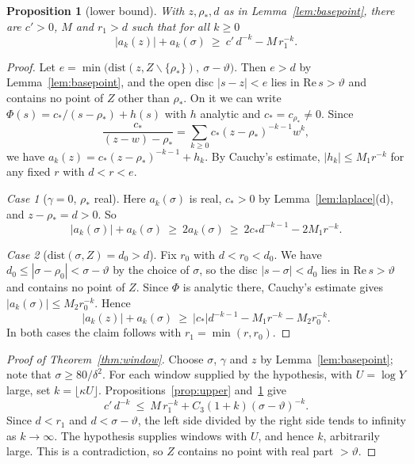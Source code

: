 \documentclass[11pt]{amsart}
\newtheorem{proposition}[theorem]{Proposition}
\theoremstyle{definition}
\theoremstyle{remark}
\begin{document}
\begin{proposition}[lower bound]\label{prop:lower}
With $z,\rho_*,d$ as in Lemma~\ref{lem:basepoint}, there are $c'>0$, $M$ and $r_1>d$ such that for all $k\ge0$
\[
|a_k(z)|+a_k(\sigma)\ \ge\ c'\,d^{-k}-M\,r_1^{-k}.
\]
\end{proposition}

\begin{proof}
Let $e=\min\bigl(\mathrm{dist}(z,Z\smallsetminus\{\rho_*\}),\ \sigma-\vartheta\bigr)$. Then $e>d$ by Lemma~\ref{lem:basepoint}, and the open disc $|s-z|<e$ lies in $\mathrm{Re}\,s>\vartheta$ and contains no point of $Z$ other than $\rho_*$. On it we can write $\Phi(s)=c_*/(s-\rho_*)+h(s)$ with $h$ analytic and $c_*=c_{\rho_*}\neq0$. Since
\[
\frac{c_*}{(z-w)-\rho_*}=\sum_{k\ge0}c_*(z-\rho_*)^{-k-1}w^k,
\]
we have $a_k(z)=c_*(z-\rho_*)^{-k-1}+h_k$. By Cauchy's estimate, $|h_k|\le M_1r^{-k}$ for any fixed $r$ with $d<r<e$.

\emph{Case 1} ($\gamma=0$, $\rho_*$ real). Here $a_k(\sigma)$ is real, $c_*>0$ by Lemma~\ref{lem:laplace}(d), and $z-\rho_*=d>0$. So
\[
|a_k(\sigma)|+a_k(\sigma)\ \ge\ 2a_k(\sigma)\ \ge\ 2c_*d^{-k-1}-2M_1r^{-k}.
\]

\emph{Case 2} ($\mathrm{dist}(\sigma,Z)=d_0>d$). Fix $r_0$ with $d<r_0<d_0$. We have $d_0\le|\sigma-\rho_0|<\sigma-\vartheta$ by the choice of $\sigma$, so the disc $|s-\sigma|<d_0$ lies in $\mathrm{Re}\,s>\vartheta$ and contains no point of $Z$. Since $\Phi$ is analytic there, Cauchy's estimate gives $|a_k(\sigma)|\le M_2r_0^{-k}$. Hence
\[
|a_k(z)|+a_k(\sigma)\ \ge\ |c_*|d^{-k-1}-M_1r^{-k}-M_2r_0^{-k}.
\]
In both cases the claim follows with $r_1=\min(r,r_0)$.
\end{proof}

\begin{proof}[Proof of Theorem~\ref{thm:window}]
Choose $\sigma$, $\gamma$ and $z$ by Lemma~\ref{lem:basepoint}; note that $\sigma\ge80/\delta^2$. For each window supplied by the hypothesis, with $U=\log Y$ large, set $k=\lfloor\kappa U\rfloor$. Propositions~\ref{prop:upper} and~\ref{prop:lower} give
\[
c'\,d^{-k}\ \le\ M\,r_1^{-k}+C_3(1+k)(\sigma-\vartheta)^{-k}.
\]
Since $d<r_1$ and $d<\sigma-\vartheta$, the left side divided by the right side tends to infinity as $k\to\infty$. The hypothesis supplies windows with $U$, and hence $k$, arbitrarily large. This is a contradiction, so $Z$ contains no point with real part $>\vartheta$.
\end{proof}
\end{document}

